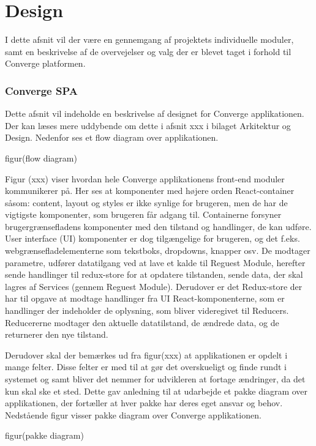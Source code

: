 \chapter{Design}

I dette afsnit vil der være en gennemgang af projektets individuelle moduler, samt en beskrivelse af de overvejelser og valg der er blevet taget i forhold til Converge platformen.

\subsection{Converge SPA}

Dette afsnit vil indeholde en beskrivelse af designet for Converge applikationen. Der kan læses mere uddybende om dette i afsnit xxx i bilaget Arkitektur og Design. Nedenfor ses et flow diagram over applikationen. 

figur(flow diagram)

Figur (xxx) viser hvordan hele Converge applikationens front-end moduler kommunikerer på. Her ses at komponenter med højere orden React-container såsom: content, layout og styles er ikke synlige for brugeren, men de har de vigtigste komponenter, som brugeren får adgang til. Containerne forsyner brugergrænsefladens komponenter med den tilstand og handlinger, de kan udføre. 
User interface (UI) komponenter er dog tilgængelige for brugeren, og det f.eks. webgrænsefladelementerne som tekstboks, dropdowns, knapper osv. De modtager parametre, udfører datatilgang ved at lave et kalde til Reguest Module, herefter sende handlinger til redux-store for at opdatere tilstanden, sende data, der skal lagres af Services (gennem Reguest Module). 
Derudover er det Redux-store der har til opgave at modtage handlinger fra UI React-komponenterne, som er handlinger der indeholder de oplysning, som bliver videregivet til Reducers. Reducererne modtager den aktuelle datatilstand, de ændrede data, og de returnerer den nye tilstand. 

Derudover skal der bemærkes ud fra figur(xxx) at applikationen er opdelt i mange felter. Disse felter er med til at gør det overskueligt og finde rundt i systemet og samt bliver det nemmer for udvikleren at fortage ændringer, da det kun skal ske et sted. Dette gav anledning til at udarbejde et pakke diagram over applikationen, der fortæller at hver pakke har deres eget ansvar og behov. Nedstående figur visser pakke diagram over Converge applikationen. 

figur(pakke diagram)

